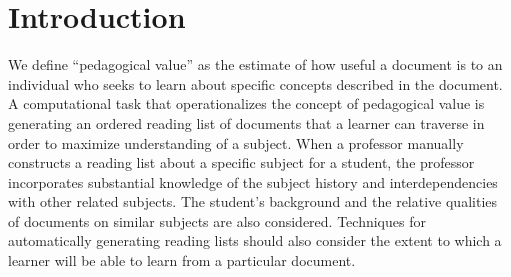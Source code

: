 \documentclass[11pt,a4paper]{article}
\begin{document}
\section{Introduction}
We define ``pedagogical value'' as the estimate of how useful a document is to an individual who seeks to learn about specific concepts described in the document. 
%
%
A computational task that operationalizes the concept of pedagogical value is generating an ordered reading list of documents that a learner can traverse in order to maximize understanding of a subject. When a professor manually constructs a reading list about a specific subject for a student, the professor incorporates substantial knowledge of the subject history and interdependencies with other related subjects. The student's background and the relative qualities of documents on similar subjects are also considered. Techniques for automatically generating reading lists should also consider the extent to which a learner will be able to learn from a particular document.
\end{document}
